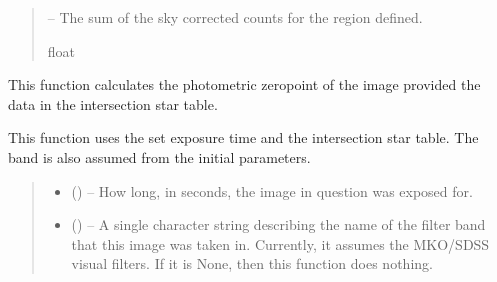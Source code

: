 \documentclass[letterpaper,11pt,english]{sphinxmanual}
\begin{document}
\begin{savenotes}
\begin{fulllineitems}
\begin{savenotes}
\begin{fulllineitems}
\begin{quote}
\begin{description}
\begin{itemize}
\end{itemize}

\sphinxAtStartPar
{} – The sum of the sky corrected counts for the region defined.

\sphinxAtStartPar
float

\end{description}\end{quote}

\end{fulllineitems}\end{savenotes}


\begin{savenotes}\begin{fulllineitems}
\label{\detokenize{code/opihiexarata.photometry.solution:opihiexarata.photometry.solution.PhotometricSolution._calculate_zero_point}}
\pysigstartsignatures
{}
\pysigstopsignatures
\sphinxAtStartPar
This function calculates the photometric zero\sphinxhyphen{}point of the image
provided the data in the intersection star table.

\sphinxAtStartPar
This function uses the set exposure time and the intersection star
table. The band is also assumed from the initial parameters.
\begin{quote}\begin{description}
\begin{itemize}
\item {} 
\sphinxAtStartPar
{} () – How long, in seconds, the image in question was exposed for.

\item {} 
\sphinxAtStartPar
{} (\sphinxstyleliteralemphasis{\sphinxupquote{, }}) – A single character string describing the name of the filter band that
this image was taken in. Currently, it assumes the MKO/SDSS visual
filters. If it is None, then this function does nothing.


\end{itemize}
\end{description}
\end{quote}
\end{fulllineitems}
\end{savenotes}
\end{fulllineitems}
\end{savenotes}
\end{document}
